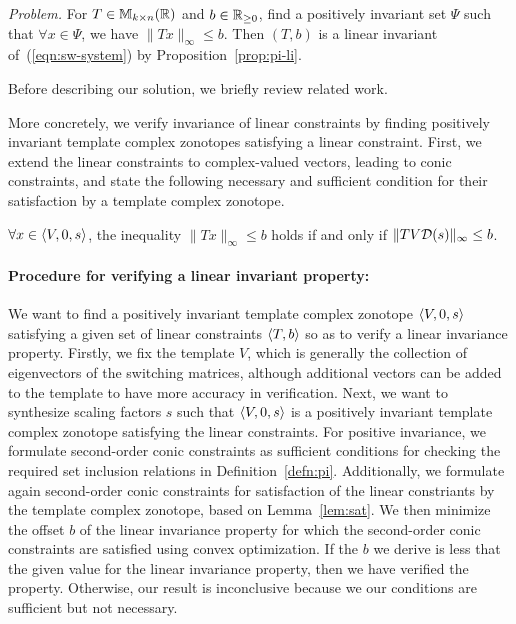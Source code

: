 %
\emph{Problem.} %
  For $T\in\mathbb{M}_{k\times n}(\mathbb{R})$ and $b\in\mathbb{R}_{\geq 0}$, find a positively invariant
  set $\Psi$ such that $\forall x\in\Psi$, we have
  $\|Tx\|_{\infty}\leq b$.  Then $(T,b)$ is a linear
  invariant of~(\ref{eqn:sw-system}) by Proposition~\ref{prop:pi-li}.


Before describing our solution, we briefly review related work.
 


More concretely, we verify invariance of linear constraints by finding
positively invariant template complex zonotopes satisfying a linear
constraint. First, we extend the linear constraints to complex-valued
vectors, leading to conic constraints, and state the following
necessary and sufficient condition for their satisfaction by a
template complex zonotope.
%
\begin{lem}\label{lem:sat}
  $\forall x\in \left<V,0,s\right>$, the inequality
  $\|Tx\|_{\infty}\leq b$ holds if and only if
  $\|TV\mathcal{D}(s)\|_{\infty}\leq b$.
\end{lem}
%
\paragraph*{Procedure for verifying a linear invariant property:} We
want to find a positively invariant template complex zonotope
$\left<V,0,s\right>$ satisfying a given set of linear constraints
$\left<T,b\right>$ so as to verify a linear invariance property.
Firstly, we fix the template $V$, which is generally the collection of
eigenvectors of the switching matrices, although additional vectors
can be added to the template to have more accuracy in verification.
Next, we want to synthesize scaling factors $s$ such that $\left<V,0,s\right>$
is a positively invariant template complex zonotope satisfying the
linear constraints.  For positive invariance, we formulate second-order conic constraints as sufficient
conditions for checking the required set inclusion relations in
Definition~\ref{defn:pi}.  Additionally, we formulate again second-order
conic constraints for satisfaction of the linear constriants by the
template complex zonotope, based on Lemma~\ref{lem:sat}.  We then
minimize the offset $b$ of the linear invariance property for which
the second-order conic constraints are satisfied using convex
optimization.  If the $b$ we derive is less that the given value for
the linear invariance property, then we have verified the property.
Otherwise, our result is inconclusive because we our conditions are
sufficient but not necessary.

